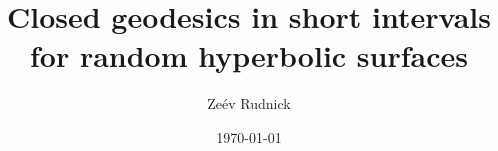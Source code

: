 \documentclass[12pt]{amsart}
\begin{document}
\newcommand{\Cov}{\operatorname{cov}}
\newcommand{\Sym}{\operatorname{Sym}}


\newcommand{\Ht}{\operatorname{Ht}}

\newcommand{\E}{\operatorname{\mathbb E}} %
\newcommand{\sign}{\operatorname{sign}} %
\newcommand{\meas}{\operatorname{meas}} %
\newcommand{\length}{\operatorname{length}} %

\newcommand{\divid}{d} %

\newcommand{\GL}{\operatorname{GL}}
\newcommand{\SL}{\operatorname{SL}}
\newcommand{\re}{\operatorname{Re}}
\newcommand{\im}{\operatorname{Im}}
\newcommand{\res}{\operatorname{Res}}
 \newcommand{\eigen}{\Lambda} %
\newcommand{\tens}{\mathbf t} %
\newcommand{\diam}{\operatorname{diam}}
\newcommand{\fixme}[1]{\footnote{Fixme: #1}}
 \newcommand{\EWp}{\mathbb E^{\rm WP}_g} %
\newcommand{\orb}{\operatorname{Orb}}
\newcommand{\supp}{\operatorname{Supp}}
\newcommand{\mmfactor }{\textcolor{red}{c_{\rm Mir}}}
\newcommand{\Mg}{\mathcal M_g} %
\newcommand{\MCG}{\operatorname{Mod}} %
\newcommand{\Diff}{\operatorname{Diff}} %
\newcommand{\If}{I_f(L,\tau)}

\newcommand{\GOE}{\operatorname{GOE}}
\newcommand{\GUE}{\operatorname{GUE}}
\newcommand{\GSE}{\operatorname{GSE}}
\newcommand{\rest}{\operatorname{rest}} %
\newcommand{\diag}{\operatorname{DIAG}} %
\newcommand{\off}{\operatorname{OFF}} %


\title[Closed geodesics in short intervals]{Closed geodesics in short intervals for random hyperbolic surfaces}
\author{Ze\'ev Rudnick}
\address{School of Mathematical Sciences, Tel Aviv University, Tel Aviv 69978, Israel} 
\date{\today}
 
\end{document}
